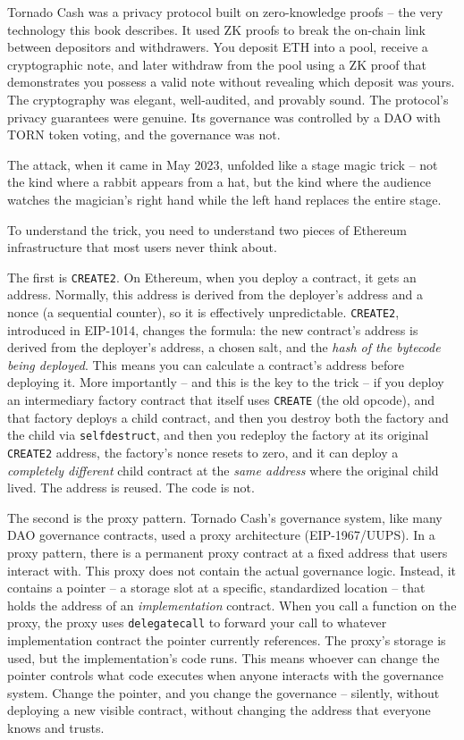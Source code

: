 \documentclass[
  11pt,
  openany]{report}
\begin{document}
Tornado Cash was a privacy protocol built on zero-knowledge proofs -- the very
technology this book describes. It used ZK proofs to break the on-chain link
between depositors and withdrawers. You deposit ETH into a pool, receive a
cryptographic note, and later withdraw from the pool using a ZK proof that
demonstrates you possess a valid note without revealing which deposit was yours.
The cryptography was elegant, well-audited, and provably sound. The protocol's
privacy guarantees were genuine. Its governance was controlled by a DAO with
TORN token voting, and the governance was not.

The attack, when it came in May 2023, unfolded like a stage magic trick -- not
the kind where a rabbit appears from a hat, but the kind where the audience
watches the magician's right hand while the left hand replaces the entire stage.

To understand the trick, you need to understand two pieces of Ethereum
infrastructure that most users never think about.

The first is \texttt{CREATE2}. On Ethereum, when you deploy a contract, it gets
an address. Normally, this address is derived from the deployer's address and a
nonce (a sequential counter), so it is effectively unpredictable.
\texttt{CREATE2}, introduced in EIP-1014, changes the formula: the new
contract's address is derived from the deployer's address, a chosen salt, and
the \emph{hash of the bytecode being deployed}. This means you can calculate a
contract's address before deploying it. More importantly -- and this is the key
to the trick -- if you deploy an intermediary factory contract that itself uses
\texttt{CREATE} (the old opcode), and that factory deploys a child contract, and
then you destroy both the factory and the child via \texttt{selfdestruct}, and
then you redeploy the factory at its original \texttt{CREATE2} address, the
factory's nonce resets to zero, and it can deploy a \emph{completely different}
child contract at the \emph{same address} where the original child lived. The
address is reused. The code is not.

The second is the proxy pattern. Tornado Cash's governance system, like many DAO
governance contracts, used a proxy architecture (EIP-1967/UUPS). In a proxy
pattern, there is a permanent proxy contract at a fixed address that users
interact with. This proxy does not contain the actual governance logic. Instead,
it contains a pointer -- a storage slot at a specific, standardized location --
that holds the address of an \emph{implementation} contract. When you call a
function on the proxy, the proxy uses \texttt{delegatecall} to forward your call
to whatever implementation contract the pointer currently references. The
proxy's storage is used, but the implementation's code runs. This means whoever
can change the pointer controls what code executes when anyone interacts with
the governance system. Change the pointer, and you change the governance --
silently, without deploying a new visible contract, without changing the address
that everyone knows and trusts.
\end{document}
